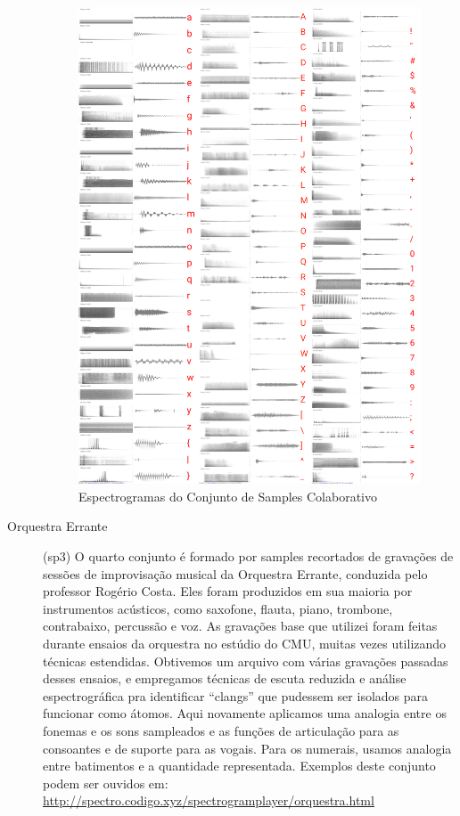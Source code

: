 \begin{description}
\begin{figure}
    \caption{\label{samplescolab}Espectrogramas do Conjunto de Samples Colaborativo}
    \begin{center}
        \includegraphics[width=1\linewidth]{pictures/cap3/bandaabertacolab.jpg}
    \end{center}
\end{figure}

\item[Orquestra Errante] (sp3) O quarto conjunto é formado por samples recortados de gravações de sessões de improvisação musical da Orquestra Errante, conduzida pelo professor Rogério Costa. Eles foram produzidos em sua maioria por instrumentos acústicos, como saxofone, flauta, piano, trombone, contrabaixo, percussão e voz. As gravações base que utilizei foram feitas durante ensaios da orquestra no estúdio do CMU, muitas vezes utilizando técnicas estendidas. Obtivemos um arquivo com várias gravações passadas desses ensaios, e empregamos técnicas de escuta reduzida e análise espectrográfica pra identificar ``clangs'' que pudessem ser isolados para funcionar como átomos. Aqui novamente aplicamos uma analogia entre os fonemas e os sons sampleados e as funções de articulação para as consoantes e de suporte para as vogais. Para os numerais, usamos analogia entre batimentos e a quantidade representada. Exemplos deste conjunto podem ser ouvidos em: \url{http://spectro.codigo.xyz/spectrogramplayer/orquestra.html}
\end{description}

